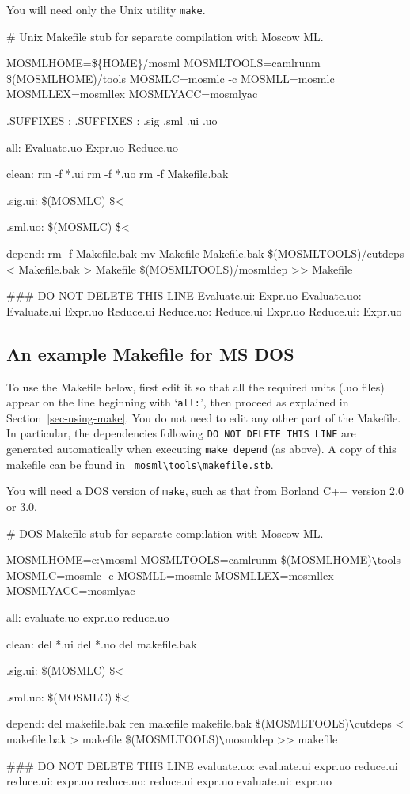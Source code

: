 \documentclass[fleqn]{article}
\begin{document}
You will need only the Unix utility {\tt make}.

\begin{program}
# Unix Makefile stub for separate compilation with Moscow ML.  

MOSMLHOME=\$\{HOME\}/mosml
MOSMLTOOLS=camlrunm \$(MOSMLHOME)/tools
MOSMLC=mosmlc -c
MOSMLL=mosmlc
MOSMLLEX=mosmllex
MOSMLYACC=mosmlyac

.SUFFIXES :
.SUFFIXES : .sig .sml .ui .uo

all: Evaluate.uo Expr.uo Reduce.uo

clean:
        rm -f *.ui
        rm -f *.uo
        rm -f Makefile.bak

.sig.ui:
        \$(MOSMLC) \$<

.sml.uo:
        \$(MOSMLC) \$<

depend: 
        rm -f Makefile.bak
        mv Makefile Makefile.bak
        \$(MOSMLTOOLS)/cutdeps < Makefile.bak > Makefile
        \$(MOSMLTOOLS)/mosmldep >> Makefile

### DO NOT DELETE THIS LINE
Evaluate.ui: Expr.uo 
Evaluate.uo: Evaluate.ui Expr.uo Reduce.ui 
Reduce.uo: Reduce.ui Expr.uo 
Reduce.ui: Expr.uo 
\end{program}


\subsection{An example Makefile for MS DOS}
\label{sec-makefile-dos}

To use the Makefile below, first edit it so that all the required
units (.uo files) appear on the line beginning with `{\tt all:}', then
proceed as explained in Section~\ref{sec-using-make}.  You do not need
to edit any other part of the Makefile.  In particular, the
dependencies following {\tt DO NOT DELETE THIS LINE} are generated
automatically when executing {\tt make depend} (as above).  A copy of
this makefile can be found in {\tt
  mosml\verb#\#tools\verb#\#makefile.stb}.

You will need a DOS version of {\tt make}, such as that from Borland
C++ version 2.0 or 3.0.

\begin{program}
# DOS Makefile stub for separate compilation with Moscow ML.  

MOSMLHOME=c:\verb#\#mosml
MOSMLTOOLS=camlrunm \$(MOSMLHOME)\verb#\#tools
MOSMLC=mosmlc -c
MOSMLL=mosmlc
MOSMLLEX=mosmllex
MOSMLYACC=mosmlyac

all: evaluate.uo expr.uo reduce.uo

clean:
        del *.ui
        del *.uo
        del makefile.bak

.sig.ui:
        \$(MOSMLC) \$<

.sml.uo:
        \$(MOSMLC) \$<

depend:
        del makefile.bak
        ren makefile makefile.bak
        \$(MOSMLTOOLS)\verb#\#cutdeps < makefile.bak > makefile
        \$(MOSMLTOOLS)\verb#\#mosmldep >> makefile

### DO NOT DELETE THIS LINE
evaluate.uo: evaluate.ui expr.uo reduce.ui 
reduce.ui: expr.uo 
reduce.uo: reduce.ui expr.uo 
evaluate.ui: expr.uo 
\end{program}
\end{document}
